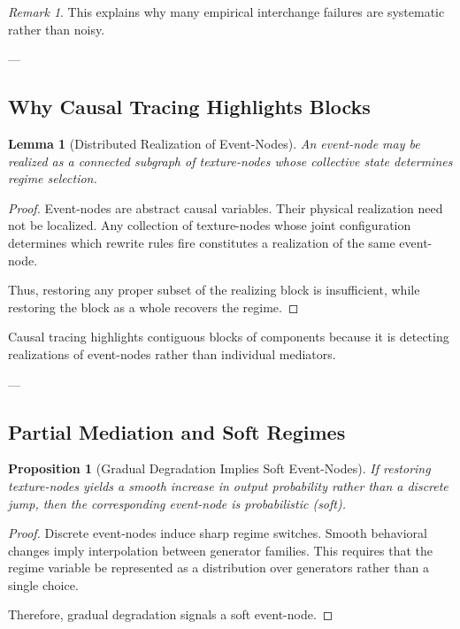 \documentclass[11pt]{article}
\newtheorem{lemma}{Lemma}
\newtheorem{proposition}{Proposition}
\theoremstyle{remark}
\newtheorem{remark}{Remark}
\begin{document}
\begin{remark}
This explains why many empirical interchange failures are systematic rather than noisy.
\end{remark}

---

\subsection{Why Causal Tracing Highlights Blocks}

\begin{lemma}[Distributed Realization of Event-Nodes]
An event-node may be realized as a connected subgraph of texture-nodes
whose collective state determines regime selection.
\end{lemma}

\begin{proof}
Event-nodes are abstract causal variables.
Their physical realization need not be localized.
Any collection of texture-nodes whose joint configuration determines which rewrite rules fire
constitutes a realization of the same event-node.

Thus, restoring any proper subset of the realizing block is insufficient,
while restoring the block as a whole recovers the regime.
\end{proof}

\begin{corollary}
Causal tracing highlights contiguous blocks of components
because it is detecting realizations of event-nodes rather than individual mediators.
\end{corollary}

---

\subsection{Partial Mediation and Soft Regimes}

\begin{proposition}[Gradual Degradation Implies Soft Event-Nodes]
If restoring texture-nodes yields a smooth increase in output probability
rather than a discrete jump, then the corresponding event-node
is probabilistic (soft).
\end{proposition}

\begin{proof}
Discrete event-nodes induce sharp regime switches.
Smooth behavioral changes imply interpolation between generator families.
This requires that the regime variable be represented as a distribution
over generators rather than a single choice.

Therefore, gradual degradation signals a soft event-node.
\end{proof}
\end{document}
